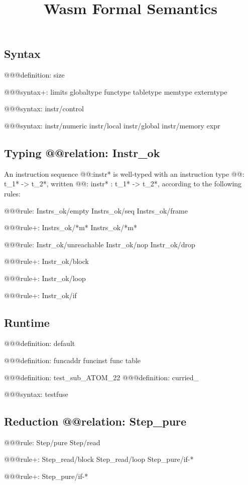 \documentclass[a4paper]{scrartcl}
\title{Wasm Formal Semantics}
\begin{document}
\small

\maketitle


\subsection*{Syntax}

@@@{definition: size}

@@@{syntax+:
  limits
  {globaltype
  functype
  tabletype
  memtype}
  {}
  externtype
}

@@@{syntax: {instr/control}}

@@@{syntax: {instr/numeric instr/local instr/global instr/memory} expr}


\subsection*{Typing @@{relation: Instr_ok}}

An instruction sequence @@{:instr*} is well-typed with an instruction type @@{: t_1* -> t_2*}, written @@{: instr* : t_1* -> t_2*}, according to the following rules:

@@@{rule:
  {Instrs_ok/empty Instrs_ok/seq}
  {Instrs_ok/frame}
}

@@@{rule+: Instrs_ok/*m* {Instrs_ok/*m*}}

@@@{rule: {Instr_ok/unreachable Instr_ok/nop Instr_ok/drop}}

@@@{rule+: Instr_ok/block}

@@@{rule+: Instr_ok/loop}

@@@{rule+: Instr_ok/if}


\subsection*{Runtime}

@@@{definition: default}

@@@{definition: {funcaddr funcinst} {func table}}

@@@{definition: test_sub_ATOM_22}
@@@{definition: curried_}

@@@{syntax: testfuse}


\subsection*{Reduction @@{relation: Step_pure}}

@@@{rule: Step/pure Step/read}

@@@{rule+: {Step_read/block Step_read/loop} {Step_pure/if-*}}

@@@{rule+: Step_pure/if-*}
\end{document}
